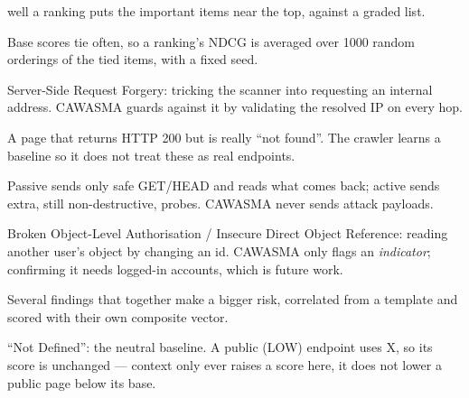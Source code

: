 \begin{description}[leftmargin=0pt,style=nextline,itemsep=3pt]
well a ranking puts the important items near the top, against a graded list.
\item[Tie-break sampling] Base scores tie often, so a ranking's NDCG is averaged
over 1000 random orderings of the tied items, with a fixed seed.
\item[SSRF] Server-Side Request Forgery: tricking the scanner into requesting an
internal address. CAWASMA guards against it by validating the resolved IP on
every hop.
\item[Soft-404] A page that returns HTTP 200 but is really ``not found''. The
crawler learns a baseline so it does not treat these as real endpoints.
\item[Passive vs.\ active scan] Passive sends only safe GET/HEAD and reads what
comes back; active sends extra, still non-destructive, probes. CAWASMA never
sends attack payloads.
\item[BOLA / IDOR] Broken Object-Level Authorisation / Insecure Direct Object
Reference: reading another user's object by changing an id. CAWASMA only flags an
\emph{indicator}; confirming it needs logged-in accounts, which is future work.
\item[Attack chain] Several findings that together make a bigger risk, correlated
from a template and scored with their own composite vector.
\item[Environmental metric ``X''] ``Not Defined'': the neutral baseline. A public
(LOW) endpoint uses X, so its score is unchanged --- context only ever raises a
score here, it does not lower a public page below its base.
\end{description}
